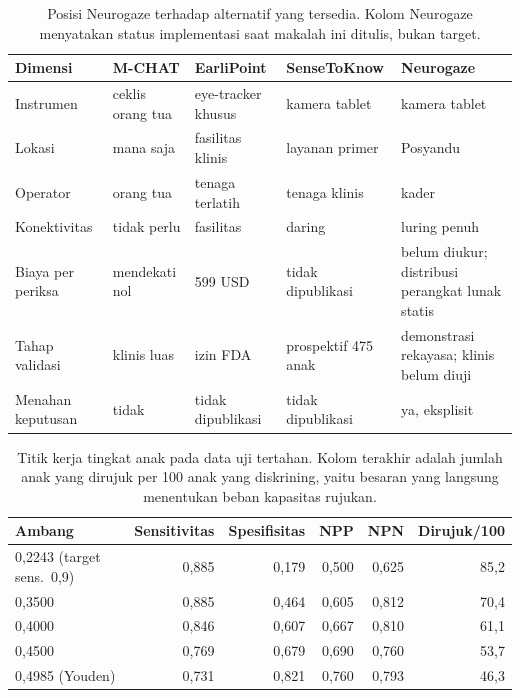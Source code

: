 \documentclass{article}
\begin{document}
\begin{table}[h]
\caption{Posisi Neurogaze terhadap alternatif yang tersedia. Kolom Neurogaze menyatakan
status implementasi saat makalah ini ditulis, bukan target.}
\label{tab:beda}
\begin{center}
\small
\begin{tabular}{lllll}
\toprule
\textbf{Dimensi} & \textbf{M-CHAT} & \textbf{EarliPoint} & \textbf{SenseToKnow} & \textbf{Neurogaze} \\
\midrule
Instrumen        & ceklis orang tua & eye-tracker khusus & kamera tablet & kamera tablet \\
Lokasi           & mana saja        & fasilitas klinis   & layanan primer & Posyandu \\
Operator         & orang tua        & tenaga terlatih    & tenaga klinis  & kader \\
Konektivitas     & tidak perlu      & fasilitas          & daring         & luring penuh \\
Biaya per periksa & mendekati nol   & 599 USD            & tidak dipublikasi & belum diukur; distribusi perangkat lunak statis \\
Tahap validasi   & klinis luas      & izin FDA           & prospektif 475 anak & demonstrasi rekayasa; klinis belum diuji \\
Menahan keputusan & tidak            & tidak dipublikasi  & tidak dipublikasi & ya, eksplisit \\
\bottomrule
\end{tabular}
\end{center}
\end{table}

\begin{table}[h]
\caption{Titik kerja tingkat anak pada data uji tertahan. Kolom terakhir adalah jumlah anak
yang dirujuk per 100 anak yang diskrining, yaitu besaran yang langsung menentukan beban
kapasitas rujukan.}
\label{tab:ambang}
\begin{center}
\small
\begin{tabular}{lrrrrr}
\toprule
\textbf{Ambang} & \textbf{Sensitivitas} & \textbf{Spesifisitas} & \textbf{NPP} & \textbf{NPN} & \textbf{Dirujuk/100} \\
\midrule
0,2243 (target sens.\ 0,9) & 0,885 & 0,179 & 0,500 & 0,625 & 85,2 \\
0,3500                     & 0,885 & 0,464 & 0,605 & 0,812 & 70,4 \\
0,4000                     & 0,846 & 0,607 & 0,667 & 0,810 & 61,1 \\
0,4500                     & 0,769 & 0,679 & 0,690 & 0,760 & 53,7 \\
0,4985 (Youden)            & 0,731 & 0,821 & 0,760 & 0,793 & 46,3 \\
\bottomrule
\end{tabular}
\end{center}
\end{table}
\end{document}
